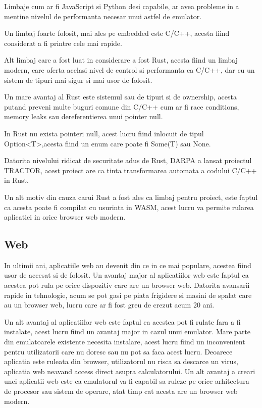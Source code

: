 \documentclass[titlepage,12pt]{article}
\begin{document}
Limbaje cum ar fi JavaScript si Python desi capabile, ar avea probleme in a mentine nivelul de performanta necesar unui astfel de emulator.

Un limbaj foarte folosit, mai ales pe embedded este C/C++, acesta fiind considerat a fi printre cele mai rapide.

Alt limbaj care a fost luat in considerare a fost Rust, acesta fiind un limbaj modern,
care oferta acelasi nivel de control si performanta ca C/C++, dar cu un sistem de tipuri mai sigur si mai usor de folosit.

Un mare avantaj al \ac {Rust} este sistemul sau de tipuri si de ownership,
acesta putand preveni multe buguri comune din C/C++ cum ar fi race conditions, memory leaks sau dereferentierea unui pointer null.

In \ac {Rust} nu exista pointeri null, acest lucru fiind inlocuit de tipul Option<T>,acesta fiind un enum care poate fi Some(T) sau None.

Datorita nivelului ridicat de securitate adus de Rust,
\ac {DARPA} a lansat proiectul TRACTOR, acest proiect are ca tinta transformarea automata a codului C/C++ in Rust.

Un alt motiv din cauza carui \ac {Rust} a fost ales ca limbaj pentru proiect, este faptul ca acesta poate fi compilat cu usurinta in \ac {WASM},
acest lucru va permite rularea aplicatiei in orice browser web modern.

\subsection{Web}

In ultimii ani, aplicatiile web au devenit din ce in ce mai populare, acestea fiind usor de accesat si de folosit.
Un avantaj major al aplicatiilor web este faptul ca acestea pot rula pe orice dispozitiv care are un browser web.
Datorita avansarii rapide in tehnologie, acum se pot gasi pe piata frigidere si masini de spalat care au un browser web, lucru care ar fi fost greu de crezut acum 20 ani.

Un alt avantaj al aplicatiilor web este faptul ca acestea pot fi rulate fara a fi instalate, acest lucru fiind un avantaj major in cazul unui emulator.
Mare parte din emulatoarele existente necesita instalare, acest lucru fiind un inconvenient pentru utilizatorii care nu doresc sau nu pot sa faca acest lucru.
Deoarece aplicatia este ruleata din browser, utilizatorul nu risca sa descarce un virus, aplicatia web neavand access direct asupra calculatorului.
Un alt avantaj a creari unei aplicatii web este ca emulatorul va fi capabil sa ruleze pe orice arhitectura de procesor sau sistem de operare, atat timp cat acesta are un browser web modern.
\end{document}
